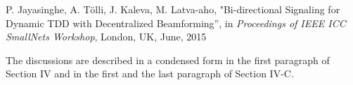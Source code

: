 \begin{enumerate}
[R3] P. Jayasinghe, A. T\"{o}lli, J. Kaleva,  M. Latva-aho, "{Bi-directional Signaling for Dynamic TDD with Decentralized Beamforming}'', in \textit{Proceedings of IEEE ICC SmallNets Workshop}, London, UK, June, 2015		

\vspace{1eM}		

The discussions are described in a condensed form in the first paragraph of Section IV and in the first and the last paragraph of Section IV-C. 

\begin{comment}


	\resp
	We thank the reviewer for the insightful comment and we apologize for the lack of clarity in explaining this information in our earlier manuscript. The answer to this question, we need to consider the following scenarios.
	\begin{enumerate}
	\item[(i)] How big is the system configuration and
	\item[(ii)] How fast the channel varies in relation to the transmit frame duration, \textit{i.e.}, whether the channel is semi-static (where the \ac{CSI} remains almost constant for multiple transmission slots) or time-correlated (where the channel changes over each transmission slot with some memory).
	\end{enumerate}
	
	\begin{itemize}
		
	\item Based on the condition (i), we can discuss the possibilities of the centralized schemes over the distributed methods using the amount of signaling overhead involved in the precoder design.
	
	\begin{enumerate}
	\item The amount of signaling required for the distributed algorithms and the centralized ones depend on the system configuration under consideration. For example, let us consider a model with \eqn{N = 1} sub-channel, \eqn{K = 4} users and \eqn{N_B = 2} \acp{BS}, each serving 2 users. Let \eqn{N_T = 4} be the number of transmit antennas and \eqn{N_R = 1} be the number of receive antennas at each user. We note that a centralized algorithm requires the knowledge of all channels matrices in the system and thus the resulting amount of information exchange is proportional to the product of the numbers of users (\eqn{K}), \acp{BS} (\eqn{N_B}), and transmit and receive antennas (\textit{i.e.}, \eqn{N_T} and \eqn{N_R}).
	

\end{comment}
\end{enumerate}
